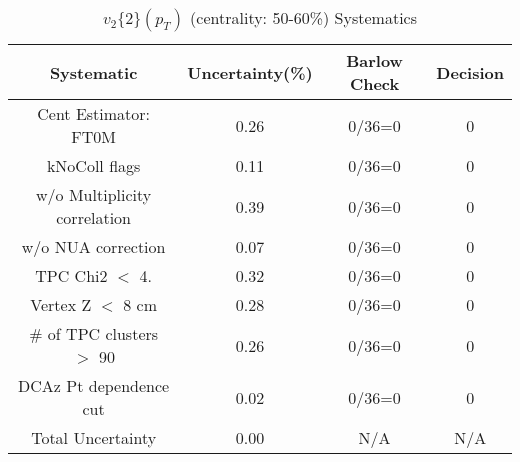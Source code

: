 \begin{table}[htbp]
\caption{$v_2\{2\}(p_{T})$ (centrality: 50-60\%) Systematics}
\label{tab:Sys_pTDiffv2}
\centering
\begin{tabular}{|c|c|c|c|}
\hline
Systematic & Uncertainty(\%) & Barlow Check & Decision \\
\hline
Cent Estimator: FT0M & 0.26 & 0/36=0 & 0 \\
kNoColl flags & 0.11 & 0/36=0 & 0 \\
w/o Multiplicity correlation & 0.39 & 0/36=0 & 0 \\
w/o NUA correction & 0.07 & 0/36=0 & 0 \\
TPC Chi2 $<$ 4. & 0.32 & 0/36=0 & 0 \\
Vertex Z $<$ 8 cm & 0.28 & 0/36=0 & 0 \\
\# of TPC clusters $>$ 90 & 0.26 & 0/36=0 & 0 \\
DCAz Pt dependence cut & 0.02 & 0/36=0 & 0 \\
\hline
Total Uncertainty & 0.00 & N/A & N/A \\
\hline
\end{tabular}
\end{table}
